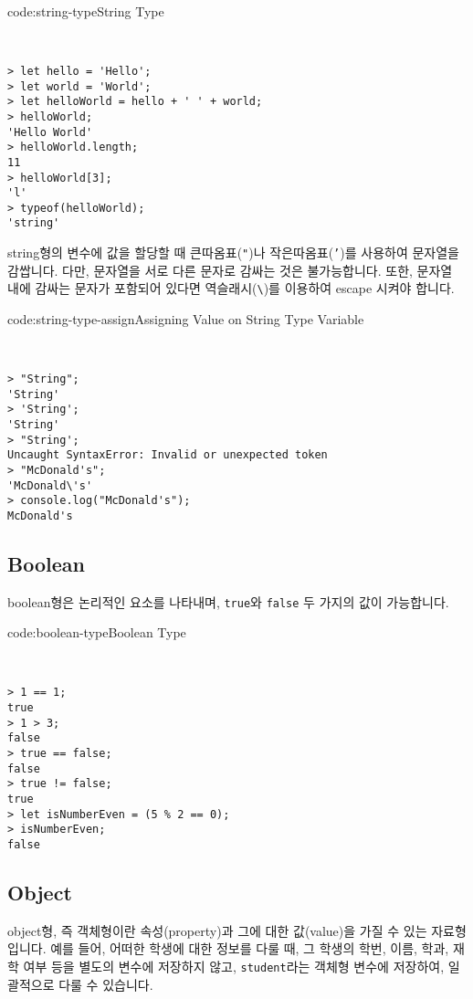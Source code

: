\begin{codeenv}{code:string-type}{String Type}\begin{verbatim}


> let hello = 'Hello';
> let world = 'World';
> let helloWorld = hello + ' ' + world;
> helloWorld;
'Hello World'
> helloWorld.length;
11
> helloWorld[3];
'l'
> typeof(helloWorld);
'string'
\end{verbatim}
\end{codeenv}

string형의 변수에 값을 할당할 때 큰따옴표(\texttt{"})나 작은따옴표(\texttt{'})를 사용하여 문자열을 감쌉니다. 다만, 문자열을 서로 다른 문자로 감싸는 것은 불가능합니다. 또한, 문자열 내에 감싸는 문자가 포함되어 있다면 역슬래시(\verb|\|)를 이용하여 escape 시켜야 합니다. 

\begin{codeenv}{code:string-type-assign}{Assigning Value on String Type Variable}\begin{verbatim}


> "String";
'String'
> 'String';
'String'
> "String';
Uncaught SyntaxError: Invalid or unexpected token
> "McDonald's";
'McDonald\'s'
> console.log("McDonald's");
McDonald's
\end{verbatim}
\end{codeenv}

\subsection*{Boolean}

boolean형은 논리적인 요소를 나타내며, \texttt{true}와 \texttt{false} 두 가지의 값이 가능합니다. 

\begin{codeenv}{code:boolean-type}{Boolean Type}\begin{verbatim}


> 1 == 1;
true
> 1 > 3;
false
> true == false;
false
> true != false;
true
> let isNumberEven = (5 % 2 == 0);
> isNumberEven;
false
\end{verbatim}
\end{codeenv}

\subsection*{Object}

object형, 즉 객체형이란 속성(property)과 그에 대한 값(value)을 가질 수 있는 자료형입니다. 예를 들어, 어떠한 학생에 대한 정보를 다룰 때, 그 학생의 학번, 이름, 학과, 재학 여부 등을 별도의 변수에 저장하지 않고, \texttt{student}라는 객체형 변수에 저장하여, 일괄적으로 다룰 수 있습니다. 

